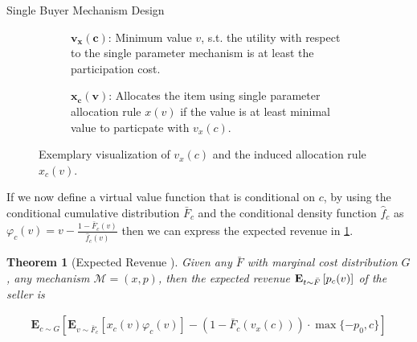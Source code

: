 \documentclass[11pt,a4paper]{article}
\newtheorem{theorem}{Theorem}
\newcommand{\Ex}[2][]{\mbox{\rm\bf E}_{#1}\left[#2\right]}
\newcommand{\1}[1]{\mbox{\rm\bf 1}_{#1}}
\begin{document}
\begin{section}{Single Buyer Mechanism Design}
\begin{figure}[htp!]
\begin{subfigure}{.4\textwidth}
         \caption{
             $\mathbf{v_x(c)}$: Minimum value $v$, s.t. the utility with respect to the single parameter mechanism is at least the participation cost.
         }
     \end{subfigure}
     \begin{subfigure}{.4\textwidth}
         \centering
         \caption{
             $\mathbf{\mathbf{x_c(v)}}$: Allocates the item using single parameter allocation rule $x(v)$ if the value is at least minimal value to particpate with $v_x(c)$.
         }
     \end{subfigure}
     \caption{
         Exemplary visualization of $v_x(c)$ and the induced allocation rule $x_c(v)$.
     }
     \label{fig:visualization-of-induced-mechanism}
 \end{figure}

 If we now define a virtual value function that is conditional on $c$, by using the conditional cumulative distribution $\bar{F}_c$ and the conditional density function $\hat{f}_c$ as
 $\varphi_c(v) = v - \frac{1- \bar{F}_c(v)}{\hat{f}_c(v)}$ then we can express the expected revenue in \cref{theorem:expected-revenue}.

 \begin{theorem}[Expected Revenue \cite{primary}]
     \label{theorem:expected-revenue}
     Given any $\bar{F}$ with marginal cost distribution $G$, any mechanism $\mathcal{M}=(x,p)$, then the expected revenue $\Ex[t \sim \bar{F}]{p_c(v)}$ of the seller is

     \begin{align*}
         \mathbf{E}_{c \sim G}\left[\mathbf{E}_{v\sim\bar{F}_c}\left[x_c(v)\varphi_c(v)\right] - (1-\bar{F}_c(v_x(c))) \cdot \max\{-p_0,c\}\right]
     \end{align*}
 \end{theorem}


\end{section}
\end{document}
